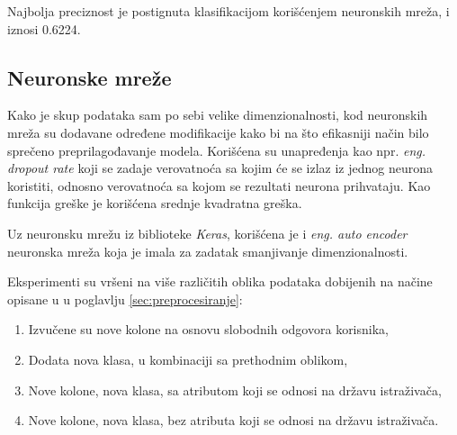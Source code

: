 \documentclass[12pt]{article}
\begin{document}
Najbolja preciznost je postignuta klasifikacijom korišćenjem neuronskih mreža, i iznosi 0.6224.

\subsection{Neuronske mreže}

Kako je skup podataka sam po sebi velike dimenzionalnosti, kod neuronskih mreža su dodavane određene modifikacije kako bi na što efikasniji način bilo sprečeno preprilagođavanje modela. 
Korišćena su unapređenja kao npr. \textit{eng. dropout rate} koji se zadaje verovatnoća sa kojim će se izlaz iz jednog neurona koristiti, odnosno verovatnoća sa kojom se rezultati neurona prihvataju.
Kao funkcija greške je korišćena srednje kvadratna greška.

Uz neuronsku mrežu iz biblioteke \textit{Keras}, korišćena je i \textit{eng. auto encoder} neuronska mreža koja je imala za zadatak smanjivanje dimenzionalnosti.

Eksperimenti su vršeni na više različitih oblika podataka dobijenih na načine opisane u u poglavlju \ref{sec:preprocesiranje}:
\begin{enumerate}
  \item Izvučene su nove kolone na osnovu slobodnih odgovora korisnika,
  \item Dodata nova klasa, u kombinaciji sa prethodnim oblikom,
  \item Nove kolone, nova klasa, sa atributom koji se odnosi na državu istraživača,
  \item Nove kolone, nova klasa, bez atributa koji se odnosi na državu istraživača.
\end{enumerate}
\end{document}
